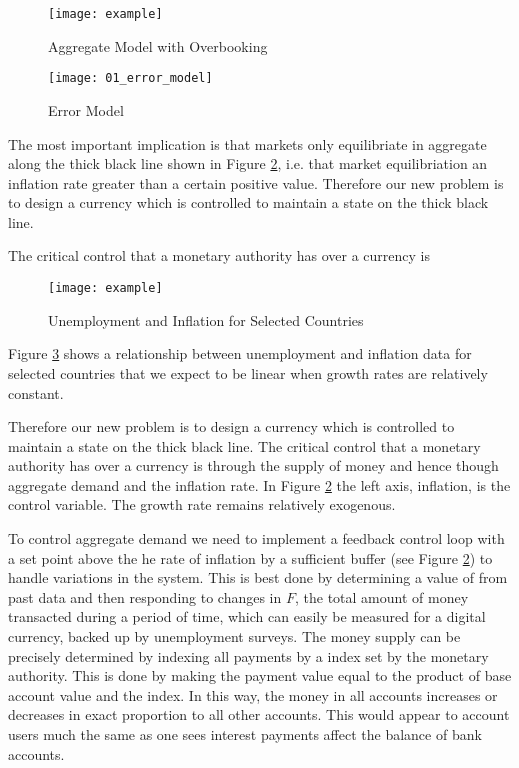 \begin{figure}
\centering
\texttt{[image: example]}
\caption{Aggregate Model with Overbooking}
\label{fig:aggregate_overbooking}
\end{figure}

\begin{figure}
\centering
\texttt{[image: 01\_error\_model]}
\caption{Error Model}
\label{fig:error_model}
\end{figure}

The most important implication is that markets only equilibriate in aggregate along the thick black
line shown in Figure \ref{fig:error_model}, i.e. that market equilibriation an inflation rate
greater than a certain positive value. Therefore our new problem is to design a currency which is
controlled to maintain a state on the thick black line.

The critical control that a monetary authority has over a currency is

\begin{figure}
\centering
\texttt{[image: example]}
\caption{Unemployment and Inflation for Selected Countries}
\label{fig:ui_multi}
\end{figure}

Figure \ref{fig:ui_multi} shows a relationship between unemployment and inflation data for selected
countries that we expect to be linear when growth rates are relatively constant.

Therefore our new problem is to design a currency which is controlled to maintain a
state on the thick black line. The critical control that a monetary authority has over a currency is
through the supply of money and hence though aggregate demand and the inflation rate. In Figure
\ref{fig:error_model} the left axis, inflation, is the control variable. The growth
rate remains relatively exogenous.

To control aggregate demand we need to implement a feedback control loop with a set point above the
he rate of inflation by a sufficient buffer (see Figure \ref{fig:error_model}) to handle variations
in the system. This is best done by determining a value of from past data and then responding to
changes in $F$, the
total amount of money transacted during a period of time, which can easily be measured for a digital
currency, backed up by unemployment surveys. The money supply can be precisely determined by
indexing all payments by a index set by the monetary authority. This is done by making the payment
value equal to the product of base account value and the index. In this way, the money in all
accounts increases or decreases in exact proportion to all other accounts. This would appear to
account users much the same as one sees interest payments affect the balance of bank accounts.

